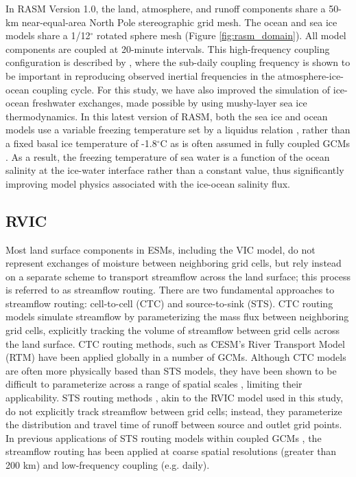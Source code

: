 \documentclass[jgrga, draft]{agutex}
\begin{document}
\begin{article}
In RASM Version 1.0, the land, atmosphere, and runoff components share a 50-km near-equal-area North Pole stereographic grid mesh.
The ocean and sea ice models share a 1/12$^{\circ}$ rotated sphere mesh (Figure \ref{fig:rasm_domain}).
All model components are coupled at 20-minute intervals.
This high-frequency coupling configuration is described by \citet{Roberts_2015a}, where the sub-daily coupling frequency is shown to be important in reproducing observed inertial frequencies in the atmosphere-ice-ocean coupling cycle.
For this study, we have also improved the simulation of ice-ocean freshwater exchanges, made possible by using mushy-layer sea ice thermodynamics.
In this latest version of RASM, both the sea ice and ocean models use a variable freezing temperature set by a liquidus relation \citep{Turner2015}, rather than a fixed basal ice temperature of -1.8$^\circ$C as is often assumed in fully coupled GCMs \citep [e.g.,][]{Jahn2012a}.
As a result, the freezing temperature of sea water is a function of the ocean salinity at the ice-water interface rather than a constant value, thus significantly improving model physics associated with the ice-ocean salinity flux.

\subsection{RVIC}
\label{sec:rvic}

Most land surface components in ESMs, including the VIC model, do not represent exchanges of moisture between neighboring grid cells, but rely instead on a separate scheme to transport streamflow across the land surface; this process is referred to as streamflow routing.
There are two fundamental approaches to streamflow routing: cell-to-cell (CTC) and source-to-sink (STS).
CTC routing models simulate streamflow by parameterizing the mass flux between neighboring grid cells, explicitly tracking the volume of streamflow between grid cells across the land surface.
CTC routing methods, such as CESM's River Transport Model (RTM) \citep{Branstetter_2003} have been applied globally in a number of GCMs.
Although CTC models are often more physically based than STS models, they have been shown to be difficult to parameterize across a range of spatial scales \citep{Sushama_2004}, limiting their applicability.
STS routing methods \citep[e.g.][]{Lohmann_1996,Naden_1992}, akin to the RVIC model used in this study, do not explicitly track streamflow between grid cells; instead, they parameterize the distribution and travel time of runoff between source and outlet grid points.
In previous applications of STS routing models within coupled GCMs \citep[e.g.][]{Olivera_2000}, the streamflow routing has been applied at coarse spatial resolutions (greater than 200 km) and low-frequency coupling (e.g. daily).


\end{article}
\end{document}
